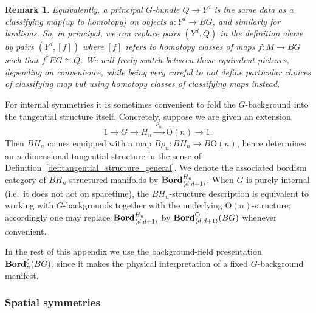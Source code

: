 \documentclass[aps,prx,reprint,superscriptaddress,twocolumn,amsmath,amssymb,amsfonts, nofootinbib]{revtex4-2}
\newcommand{\bordd}{{\bf Bord}_{\langle d, d+1\rangle}}
\newcommand{\Bord}{{\bf Bord}_{n}}
\theoremstyle{apsstyle}
\newtheorem{remark}[theorem]{Remark}
\begin{document}
\bigskip 

\begin{remark}
\label{remark:pgb}
Equivalently, a principal $G$-bundle $Q\to Y^{d}$ is the same data as a classifying map(up to homotopy) on objects $a:Y^{d}\to BG$, and similarly for bordisms. So, in principal, we can replace pairs $(Y^{d}, Q)$ in the definition above by pairs $(Y^{d}, [f])$ where $[f]$ refers to homotopy classes of maps $f: M \to BG$ such that $f^{*}EG\cong Q$. We will freely switch between these equivalent pictures, depending on convenience, while being very careful to not define particular choices of classifying map but using homotopy classes of classifying maps instead. 
\end{remark}

\bigskip

\noindent For internal symmetries it is sometimes convenient to fold the $G$-background into the tangential structure itself. Concretely, suppose we are given an extension
\begin{equation}
\label{eq:FH_extension}
1 \longrightarrow G \longrightarrow H_{n}
\xrightarrow{\;\rho_{n}\;} \mathrm{O}(n) \longrightarrow 1.
\end{equation}
Then $BH_n$ comes equipped with a map $B\rho_n:BH_n\to B\mathrm{O}(n)$, hence determines an $n$-dimensional tangential structure in the sense of Definition~\ref{def:tangential_structure_general}. We denote the associated bordism category of $BH_n$-structured manifolds by $\bordd^{H_n}$. When $G$ is purely internal (i.e.\ it does not act on spacetime), the $BH_n$-structure
description is equivalent to working with $G$-backgrounds together with the underlying $\mathrm{O}(n)$-structure; accordingly one may replace $\bordd^{H_n}$ by $\bordd^{\mathrm{O}}(BG)$ whenever convenient.

\medskip

\noindent
In the rest of this appendix we use the background-field presentation
$\Bord^{\xi}(BG)$, since it makes the physical interpretation of a fixed $G$-background manifest.

\medskip

\subsubsection{Spatial symmetries}
\label{app:bordism_spatial_sym}
\end{document}
